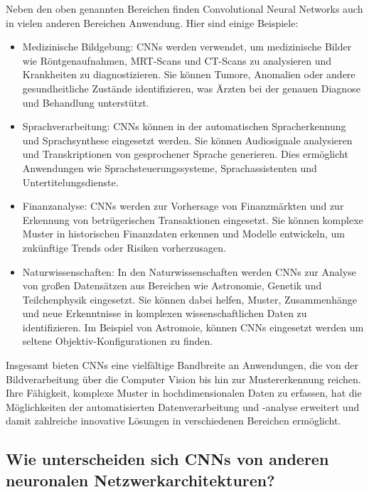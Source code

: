     Neben den oben genannten Bereichen finden Convolutional Neural Networks auch in vielen anderen Bereichen Anwendung. Hier sind einige Beispiele:
    \begin{itemize}
    \item Medizinische Bildgebung: \acp{CNN} werden verwendet, um medizinische Bilder wie Röntgenaufnahmen, MRT-Scans und CT-Scans zu analysieren und Krankheiten zu diagnostizieren. Sie können Tumore, Anomalien oder andere gesundheitliche Zustände identifizieren, was Ärzten bei der genauen Diagnose und Behandlung unterstützt.

    \item Sprachverarbeitung: \acp{CNN} können in der automatischen Spracherkennung und Sprachsynthese eingesetzt werden. Sie können Audiosignale analysieren und Transkriptionen von gesprochener Sprache generieren. Dies ermöglicht Anwendungen wie Sprachsteuerungssysteme, Sprachassistenten und Untertitelungsdienste.

    \item Finanzanalyse: \acp{CNN} werden zur Vorhersage von Finanzmärkten und zur Erkennung von betrügerischen Transaktionen eingesetzt. Sie können komplexe Muster in historischen Finanzdaten erkennen und Modelle entwickeln, um zukünftige Trends oder Risiken vorherzusagen.

    \item Naturwissenschaften: In den Naturwissenschaften werden \acp{CNN} zur Analyse von großen Datensätzen aus Bereichen wie Astronomie, Genetik und Teilchenphysik eingesetzt. Sie können dabei helfen, Muster, Zusammenhänge und neue Erkenntnisse in komplexen wissenschaftlichen Daten zu identifizieren. Im Beispiel von Astromoie, können \acp{CNN} eingesetzt werden um seltene Objektiv-Konfigurationen zu finden.

    \end{itemize}
    
    Insgesamt bieten \acfp{CNN} eine vielfältige Bandbreite an Anwendungen, die von der Bildverarbeitung über die Computer Vision bis hin zur Mustererkennung reichen. Ihre Fähigkeit, komplexe Muster in hochdimensionalen Daten zu erfassen, hat die Möglichkeiten der automatisierten Datenverarbeitung und -analyse erweitert und damit zahlreiche innovative Lösungen in verschiedenen Bereichen ermöglicht.
    
\subsection{Wie unterscheiden sich CNNs von anderen neuronalen Netzwerkarchitekturen?}

